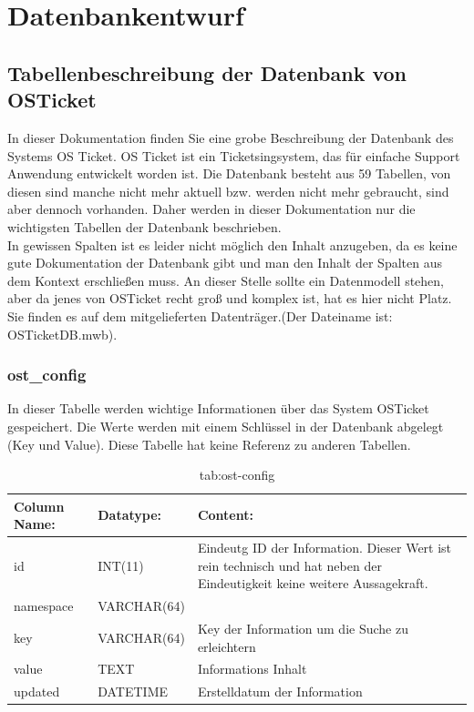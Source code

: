 \newpage
\renewcommand{\arraystretch}{1.5}
\newcommand{\code}{\texttt}
\section{Datenbankentwurf}
\def \currentAuthor{Elias Gabl}

\subsection{Tabellenbeschreibung der Datenbank von OSTicket}

In dieser Dokumentation finden Sie eine grobe Beschreibung der Datenbank des Systems OS Ticket. OS Ticket ist ein Ticketsingsystem, das für einfache Support Anwendung entwickelt worden ist. Die Datenbank besteht aus 59 Tabellen, von diesen sind manche nicht mehr aktuell bzw. werden nicht mehr gebraucht, sind aber dennoch vorhanden. Daher werden in dieser Dokumentation nur die wichtigsten Tabellen der Datenbank beschrieben.\\
In gewissen Spalten ist es leider nicht möglich den Inhalt anzugeben, da es keine gute Dokumentation der Datenbank gibt und man den Inhalt der Spalten aus dem Kontext erschließen muss.
\newline
\newline
An dieser Stelle sollte ein Datenmodell stehen, aber da jenes von OSTicket recht groß und komplex ist, hat es hier nicht Platz. Sie finden es auf dem mitgelieferten Datenträger.(Der Dateiname ist: OSTicketDB.mwb).


\newpage

\subsubsection{ost\_config}

In dieser Tabelle werden wichtige Informationen über das System OSTicket gespeichert. Die Werte werden mit einem Schlüssel in der Datenbank abgelegt (Key und Value).
Diese Tabelle hat keine Referenz zu anderen Tabellen.

\begin{table}[h]
	\begin{tabular}{|p{3.5cm}|p{4cm}|p{6.2cm}|}
		\hline
		\textbf{Column Name:} & \textbf{Datatype:} & \textbf{Content:}\\
		\hline
		id & INT(11) & Eindeutg ID der Information. Dieser Wert ist rein technisch und hat  neben der Eindeutigkeit keine weitere 
		Aussagekraft. \\
		\hline
		namespace & VARCHAR(64) & \\
		\hline
		key & VARCHAR(64) & Key der Information um die Suche zu erleichtern\\
		\hline
		value & TEXT & Informations Inhalt\\
		\hline
		updated & DATETIME & Erstelldatum der Information\\
		\hline
	\end{tabular}
	\caption{tab:ost-config}
\end{table}
\label{tab:ost_config}
\newpage


